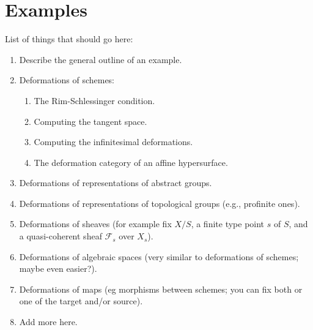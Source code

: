 \section{Examples}
\label{section-examples}

\noindent
List of things that should go here:
\begin{enumerate}
\item Describe the general outline of an example.
\item Deformations of schemes:
\begin{enumerate}
\item The Rim-Schlessinger condition.
\item Computing the tangent space.
\item Computing the infinitesimal deformations.
\item The deformation category of an affine hypersurface.
\end{enumerate}
\item Deformations of representations of abstract groups.
\item Deformations of representations of topological groups
(e.g., profinite ones).
\item Deformations of sheaves (for example fix $X/S$, a finite type point
$s$ of $S$, and a quasi-coherent sheaf $\mathcal{F}_s$ over $X_s$).
\item Deformations of algebraic spaces (very similar to deformations
of schemes; maybe even easier?).
\item Deformations of maps (eg morphisms between schemes; you can fix
both or one of the target and/or source).
\item Add more here.
\end{enumerate}








